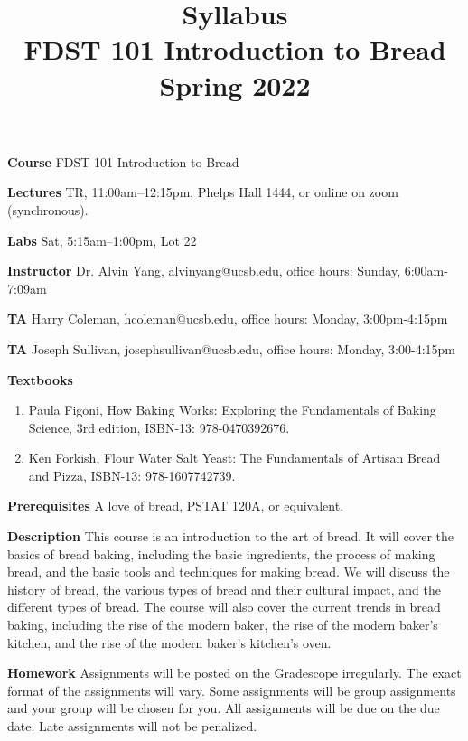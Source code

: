 \documentclass[12pt]{article}
\begin{document}
\title{Syllabus \\
    \large{FDST 101 Introduction to Bread \\
    Spring 2022}
}
\author{}
\date{}
\maketitle

\textbf{Course} FDST 101 Introduction to Bread

\textbf{Lectures} TR, 11:00am--12:15pm, Phelps Hall 1444, or online on zoom (synchronous). 

\textbf{Labs} Sat, 5:15am--1:00pm, Lot 22

\textbf{Instructor}
Dr. Alvin Yang, alvinyang@ucsb.edu, office hours: Sunday, 6:00am-7:09am

\textbf{TA} 
Harry Coleman, hcoleman@ucsb.edu, office hours: Monday, 3:00pm-4:15pm

\textbf{TA}
Joseph Sullivan, josephsullivan@ucsb.edu, office hours: Monday, 3:00-4:15pm

\textbf{Textbooks}
\begin{enumerate}
    \item Paula Figoni, How Baking Works: Exploring the Fundamentals of Baking Science, 3rd edition, ISBN-13: 978-0470392676.
    \item Ken Forkish, Flour Water Salt Yeast: The Fundamentals of Artisan Bread and Pizza, ISBN-13: 978-1607742739.
\end{enumerate}

\textbf{Prerequisites} A love of bread, PSTAT 120A, or equivalent. 

\textbf{Description} This course is an introduction to the art of bread. It will cover the basics of bread baking, including the basic ingredients, the process of making bread, and the basic tools and techniques for making bread. We will discuss the history of bread, the various types of bread and their cultural impact, and the different types of bread. The course will also cover the current trends in bread baking, including the rise of the modern baker, the rise of the modern baker's kitchen, and the rise of the modern baker's kitchen's oven. 

\textbf{Homework} Assignments will be posted on the Gradescope irregularly. The exact format of the assignments will vary. Some assignments will be group assignments and your group will be chosen for you. All assignments will be due on the due date. Late assignments will not be penalized.
\end{document}
